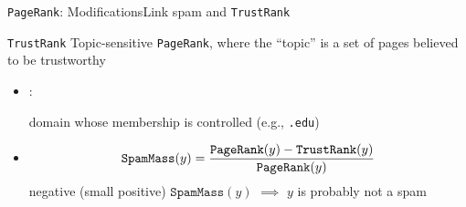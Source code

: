 \documentclass[xcolor=table,final]{beamer} %
\newcommand{\PageRank}{\texttt{PageRank}\xspace}
\newcommand{\TrustRank}{\texttt{TrustRank}\xspace}
\begin{document}
\begin{frame}{\PageRank : Modifications}{Link spam and \TrustRank}
  \begin{exampleblock}{\TrustRank}
    Topic-sensitive \PageRank, where the ``topic'' is a set of pages believed to be trustworthy
    
    \begin{itemize}
    \item {}: 

      domain whose membership is controlled (e.g., \texttt{.edu})
      \pause
    \item {}
      \begin{equation*}
        \texttt{SpamMass}(y) = \frac{\text{\PageRank}(y) - \text{\TrustRank}(y)}{\text{\PageRank}(y)}
      \end{equation*}
      negative (small positive) $\texttt{SpamMass}(y)$ $\implies$ $y$ is probably not a spam
  \end{itemize}
  \end{exampleblock}
\end{frame}
\end{document}
